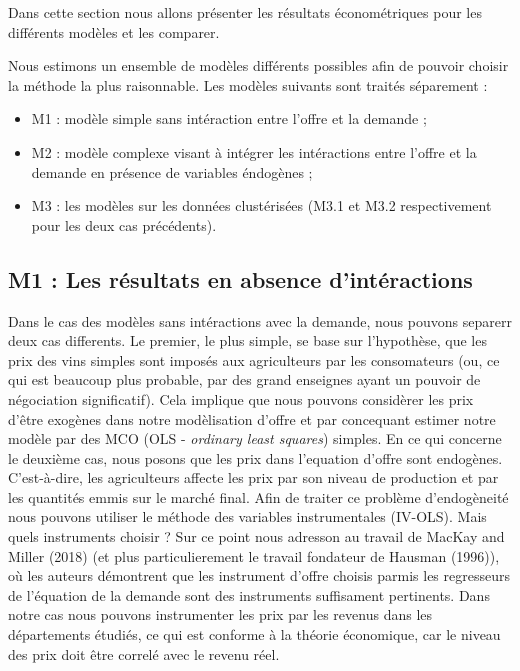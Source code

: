 \documentclass[11pt,]{article}
\providecommand{\tightlist}{%
  \setlength{\itemsep}{0pt}\setlength{\parskip}{0pt}}
\begin{document}
Dans cette section nous allons présenter les résultats économétriques
pour les différents modèles et les comparer.

Nous estimons un ensemble de modèles différents possibles afin de
pouvoir choisir la méthode la plus raisonnable. Les modèles suivants
sont traités séparement :

\begin{itemize}
\tightlist
\item
  M1 : modèle simple sans intéraction entre l'offre et la demande ;
\item
  M2 : modèle complexe visant à intégrer les intéractions entre l'offre
  et la demande en présence de variables éndogènes ;
\item
  M3 : les modèles sur les données clustérisées (M3.1 et M3.2
  respectivement pour les deux cas précédents).
\end{itemize}

\hypertarget{m1-les-resultats-en-absence-dinteractions}{%
\subsection{M1 : Les résultats en absence
d'intéractions}\label{m1-les-resultats-en-absence-dinteractions}}

Dans le cas des modèles sans intéractions avec la demande, nous pouvons
separerr deux cas differents. Le premier, le plus simple, se base sur
l'hypothèse, que les prix des vins simples sont imposés aux agriculteurs
par les consomateurs (ou, ce qui est beaucoup plus probable, par des
grand enseignes ayant un pouvoir de négociation significatif). Cela
implique que nous pouvons considèrer les prix d'être exogènes dans notre
modèlisation d'offre et par concequant estimer notre modèle par des MCO
(OLS - \emph{ordinary least squares}) simples. En ce qui concerne le
deuxième cas, nous posons que les prix dans l'equation d'offre sont
endogènes. C'est-à-dire, les agriculteurs affecte les prix par son
niveau de production et par les quantités emmis sur le marché final.
Afin de traiter ce problème d'endogèneité nous pouvons utiliser le
méthode des variables instrumentales (IV-OLS). Mais quels instruments
choisir ? Sur ce point nous adresson au travail de MacKay and Miller
(2018) (et plus particulierement le travail fondateur de Hausman
(1996)), où les auteurs démontrent que les instrument d'offre choisis
parmis les regresseurs de l'équation de la demande sont des instruments
suffisament pertinents. Dans notre cas nous pouvons instrumenter les
prix par les revenus dans les départements étudiés, ce qui est conforme
à la théorie économique, car le niveau des prix doit être correlé avec
le revenu réel.
\end{document}
